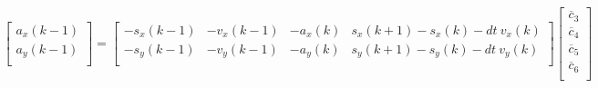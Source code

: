 \documentclass[10pt]{article}         %
\begin{document}
\begin{align}
    \begin{bmatrix}
        a_x(k-1) \\ 
        a_y(k-1) \\ 
    \end{bmatrix}
    =
    \begin{bmatrix}
        - s_x(k-1) & - v_x(k-1) & -  a_x(k)  &s_x(k+1) - s_x(k) - dt \  v_x(k) \\
        - s_y(k-1) & - v_y(k-1) & -  a_y(k)  &s_y(k+1) - s_y(k) - dt \  v_y(k) \\
    \end{bmatrix}
    \begin{bmatrix}
        \overline c_3 \\
        \overline c_4 \\
        \overline c_5 \\
        \overline c_6 \\
   \end{bmatrix}
\end{align}
\end{document}

